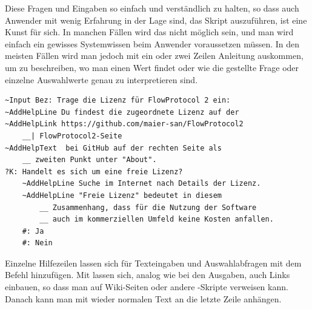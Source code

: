 Diese Fragen und Eingaben so einfach und verständlich zu halten, so dass auch Anwender mit wenig Erfahrung in der Lage sind, das Skript auszuführen, ist eine Kunst für sich. In manchen Fällen wird das nicht möglich sein, und man wird einfach ein gewisses Systemwissen beim Anwender voraussetzen müssen. In den meisten Fällen wird man jedoch mit ein oder zwei Zeilen Anleitung auskommen, um zu beschreiben, wo man einen Wert findet oder wie die gestellte Frage oder einzelne Auswahlwerte genau zu interpretieren sind.

\label{BspHilfezeilen}
\begin{verbatim}
~Input Bez: Trage die Lizenz für FlowProtocol 2 ein:
~AddHelpLine Du findest die zugeordnete Lizenz auf der 
~AddHelpLink https://github.com/maier-san/FlowProtocol2
    __| FlowProtocol2-Seite
~AddHelpText  bei GitHub auf der rechten Seite als 
    __ zweiten Punkt unter "About".
?K: Handelt es sich um eine freie Lizenz?
    ~AddHelpLine Suche im Internet nach Details der Lizenz.
    ~AddHelpLine "Freie Lizenz" bedeutet in diesem
        __ Zusammenhang, dass für die Nutzung der Software
        __ auch im kommerziellen Umfeld keine Kosten anfallen.
    #: Ja
    #: Nein
\end{verbatim}

Einzelne Hilfezeilen lassen sich für Texteingaben und Auswahlabfragen mit dem Befehl  hinzufügen. Mit  lassen sich, analog wie bei den Ausgaben, auch Links einbauen, so dass man auf Wiki-Seiten oder andere \FPZb-Skripte verweisen kann. Danach kann man mit  wieder normalen Text an die letzte Zeile anhängen.


